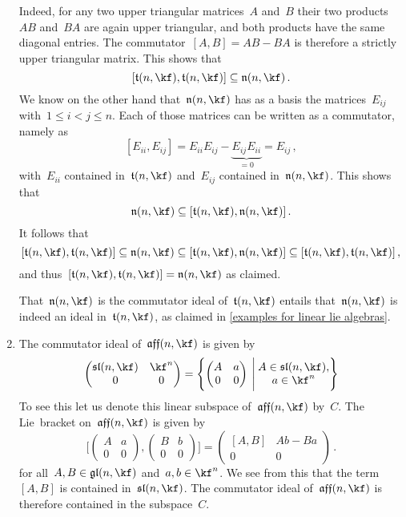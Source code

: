 \begin{example}
\begin{enumerate}
			Indeed, for any two upper triangular matrices~$A$ and~$B$ their two products~$AB$ and~$BA$ are again upper triangular, and both products have the same diagonal entries.
			The commutator~$[A,B] = AB - BA$ is therefore a strictly upper triangular matrix.
			This shows that
			\[
				[\trianglie(n, \kf), \trianglie(n, \kf)]
				\subseteq
				\upperlie(n, \kf) \,.
			\]
			We know on the other hand that~$\upperlie(n, \kf)$ has as a basis the matrices~$E_{ij}$ with~$1 \leq i < j \leq n$.
			Each of those matrices can be written as a commutator, namely as
			\[
				[E_{ii}, E_{ij}]
				=
				E_{ii} E_{ij} - \underbrace{ E_{ij} E_{ii} }_{= 0}
				=
				E_{ij} \,,
			\]
			with~$E_{ii}$ contained in~$\trianglie(n, \kf)$ and~$E_{ij}$ contained in~$\upperlie(n, \kf)$.
			This shows that
			\[
				\upperlie(n, \kf)
				\subseteq
				[\trianglie(n, \kf), \upperlie(n, \kf)] \,.
			\]
			It follows that
			\[
				[ \trianglie(n, \kf), \trianglie(n, \kf) ]
				\subseteq
				\upperlie(n, \kf)
				\subseteq
				[ \trianglie(n, \kf), \upperlie(n, \kf) ]
				\subseteq
				[ \trianglie(n, \kf), \trianglie(n, \kf) ] \,,
			\]
			and thus~$[ \trianglie(n, \kf), \trianglie(n, \kf) ] = \upperlie(n, \kf)$ as claimed.

			That~$\upperlie(n, \kf)$ is the commutator ideal of~$\trianglie(n, \kf)$ entails that~$\upperlie(n, \kf)$ is indeed an ideal in~$\trianglie(n, \kf)$, as claimed in \cref{examples for linear lie algebras}.
		\item
			The commutator ideal of~$\afflie(n, \kf)$ is given by
			\[
				\begin{pmatrix}
					\sllie(n, \kf)  & \kf^n \\
					0               & 0
				\end{pmatrix}
				=
				\Biggl\{
					\begin{pmatrix}
						A & a \\
						0 & 0
					\end{pmatrix}
				\suchthat[\Bigg]
					\begin{array}{@{}c@{}}
						A \in \sllie(n, \kf), \\
						a \in \kf^n
					\end{array}
				\Biggr\}
			\]
			To see this let us denote this linear subspace of~$\afflie(n, \kf)$ by~$C$.
			The Lie~bracket on~$\afflie(n, \kf)$ is given by
			\[
				\Biggl[
					\begin{pmatrix}
						A & a \\
						0 & 0
					\end{pmatrix}
					,
					\begin{pmatrix}
						B & b \\
						0 & 0
					\end{pmatrix}
				\Biggr]
				=
				\begin{pmatrix}
					[A, B]  & A b - B a \\
					0       & 0
				\end{pmatrix} \,.
			\]
			for all~$A, B \in \gllie(n, \kf)$ and~$a, b \in \kf^n$.
			We see from this that the term~$[A, B]$ is contained in~$\sllie(n, \kf)$.
			The commutator ideal of~$\afflie(n, \kf)$ is therefore contained in the subspace~$C$.


\end{enumerate}
\end{example}
